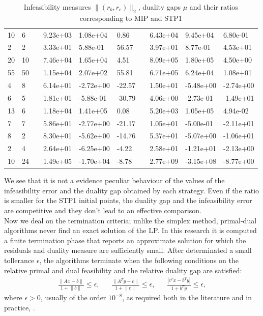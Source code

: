 \documentclass[a4paper,10 pt,titlepage,twoside]{book}
\theoremstyle{plain}
\theoremstyle{definition}
\theoremstyle{remark}
\begin{document}
\begin{table}[!h]
\begin{tabular}{llllllllll}
		10 & 6 &  & 9.23e+03 & 1.08e+04 & 0.86 &  & 6.43e+04 & 9.45e+04 & 6.80e-01 \\
		2 & 2 &  & 3.33e+01 & 5.88e-01 & 56.57 &  & 3.97e+01 & 8.77e-01 & 4.53e+01 \\
		20 & 10 &  & 7.46e+04 & 1.65e+04 & 4.51 &  & 8.09e+05 & 1.80e+05 & 4.50e+00 \\
		55 & 50 &  & 1.15e+04 & 2.07e+02 & 55.81 &  & 6.71e+05 & 6.24e+04 & 1.08e+01 \\
		4 & 8 &  & 6.14e+01 & -2.72e+00 & -22.57 &  & 1.50e+01 & -5.48e+00 & -2.74e+00 \\
		6 & 5 &  & 1.81e+01 & -5.88e-01 & -30.79 &  & 4.06e+00 & -2.73e-01 & -1.49e+01 \\
		13 & 6 &  & 1.18e+04 & 1.41e+05 & 0.08 &  & 5.20e+03 & 1.05e+05 & 4.94e-02 \\
		7 & 7 &  & 5.86e+01 & -2.77e+00 & -21.17 &  & 1.05e+01 & -5.00e-01 & -2.11e+01 \\
		8 & 2 &  & 8.30e+01 & -5.62e+00 & -14.76 &  & 5.37e+01 & -5.07e+00 & -1.06e+01 \\
		2 & 4 &  & 2.64e+01 & -6.25e+00 & -4.22 &  & 2.58e+01 & -1.21e+01 & -2.13e+00 \\
		10 & 24 &  & 1.49e+05 & -1.70e+04 & -8.78 &  & 2.77e+09 & -3.15e+08 & -8.77e+00 \\ \hline
	\end{tabular}\caption{Infeasibility measures $\lVert (r_{b}, r_{c})\rVert_{2}$, duality gaps ${\mu}$ and their ratios corresponding to MIP and STP1}
\end{table}
We see that it is not a evidence peculiar behaviour of the values of the infeasibility error and the duality gap obtained by each strategy. Even if the ratio is smaller for the STP1 initial points, the duality gap and the infeasibility error are competitive and they don't lead to an effective comparison.\\ 
\newpage
Now we deal on the termination criteria; unlike the simplex method, primal-dual algorithms never find an exact solution of the LP. In this research it is computed a finite termination phase that reports an approximate solution for which the residuals and duality measure are sufficiently small. After determinated a small tollerance $\epsilon$, the algorithms terminate when the following conditions on the relative primal and dual feasibility and the relative duality gap are satisfied:
\begin{align*}
\frac{\lVert Ax -b\rVert}{1+ \lVert b \rVert}\leq \epsilon, && \frac{\lVert A^{T}y -c\rVert}{1 + \lVert c \rVert}\leq \epsilon, &&\frac{|c^{T}x - b^{T}y|}{1+b^{T}y}\leq \epsilon,
\end{align*}
where $\epsilon > 0$, usually of the order $10^{-8}$, as required both in the literature and in practice, \cite{Wright}.
\end{document}
